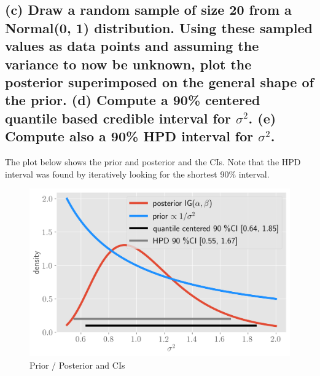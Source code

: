 \documentclass[11pt]{article}
\begin{document}
\subsection*{(c) Draw a random sample of size 20 from a Normal(0, 1) distribution. Using these sampled values as data points and assuming the variance to now be unknown, plot the posterior superimposed on the general shape of the prior. (d) Compute a 90\% centered quantile based credible interval for $\sigma^2$. (e) Compute also a 90\% HPD interval for $\sigma^2$.}
The plot below shows the  prior and posterior and the CIs. Note that the HPD interval was found by iteratively looking for the shortest 90\% interval.

\begin{figure}[!h]
    \centering
    \includegraphics[scale=.6
    ]{homework_3/figures/poisson.png}
    \caption{Prior / Posterior and CIs }
    \label{fig:my_label}
\end{figure}
\end{document}
